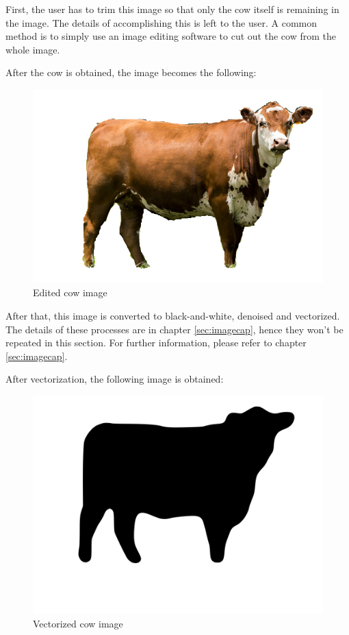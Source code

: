 \documentclass{dalthesis}
\begin{document}
First, the user has to trim this image so that only the cow itself is remaining in the image. The details of accomplishing this is left to the user. A common method is to simply use an image editing software to cut out the cow from the whole image.

After the cow is obtained, the image becomes the following:

\begin{figure}[H]
	\caption{Edited cow image}
  \includegraphics[width=\textwidth,height=\textheight,keepaspectratio]{process/cow.jpg}
\end{figure}

After that, this image is converted to black-and-white, denoised and vectorized. The details of these processes are in chapter \ref{sec:imagecap}, hence they won't be repeated in this section. For further information, please refer to chapter \ref{sec:imagecap}.

After vectorization, the following image is obtained:

\begin{figure}[H]
	\caption{Vectorized cow image}
  \includegraphics[width=\textwidth,height=\textheight,keepaspectratio]{process/cow-black-and-white-denoised-polygon.jpg}
\end{figure}
\end{document}
